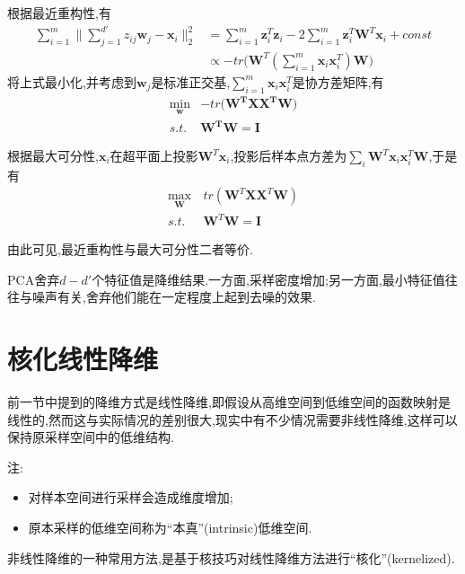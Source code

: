 根据最近重构性,有
\begin{equation}\begin{split}
\sum_{i=1}^m\|\sum_{j=1}^{d'}z_{ij}\mathbf{w}_j-\mathbf{x}_i\|_2^2&=\sum_{i=1}^m\mathbf{z}_i^T\mathbf{z}_i-2\sum_{i=1}^m\mathbf{z}_i^T\mathbf{W}^T\mathbf{x}_i+const\\&\propto -tr\Big(\mathbf{W}^T(\sum_{i=1}^m\mathbf{x}_i\mathbf{x}_i^T)\mathbf{W}\Big)
\end{split}\end{equation}
将上式最小化,并考虑到$\mathbf{w}_j$是标准正交基,$\sum_{i=1}^m\mathbf{x}_i\mathbf{x}_i^T$是协方差矩阵,有
\begin{equation}\begin{split}
\min_\mathbf{w}&-tr\Big(\mathbf{W^TXX^TW}\Big)\\
s.t.& \mathbf{W^TW=I}
\end{split}\end{equation}

根据最大可分性,$\mathbf{x}_i$在超平面上投影$\mathbf{W}^T\mathbf{x}_i$,投影后样本点方差为$\sum_i\mathbf{W}^T\mathbf{x}_i\mathbf{x}_i^T\mathbf{W}$,于是有
\begin{equation}\begin{split}
\max_{\mathbf{W}}&\,tr(\mathbf{W}^T\mathbf{XX}^T\mathbf{W})\\
s.t.&\,\mathbf{W}^T\mathbf{W=I}
\end{split}\end{equation}

由此可见,最近重构性与最大可分性二者等价.

PCA舍弃$d-d'$个特征值是降维结果.一方面,采样密度增加;另一方面,最小特征值往往与噪声有关,舍弃他们能在一定程度上起到去噪的效果.

\section{核化线性降维}

前一节中提到的降维方式是线性降维,即假设从高维空间到低维空间的函数映射是线性的,然而这与实际情况的差别很大,现实中有不少情况需要非线性降维,这样可以保持原采样空间中的低维结构.

注:
\begin{itemize}
\item 对样本空间进行采样会造成维度增加;
\item 原本采样的低维空间称为``本真''(intrinsic)低维空间.
\end{itemize}

非线性降维的一种常用方法,是基于核技巧对线性降维方法进行``核化''(kernelized).

